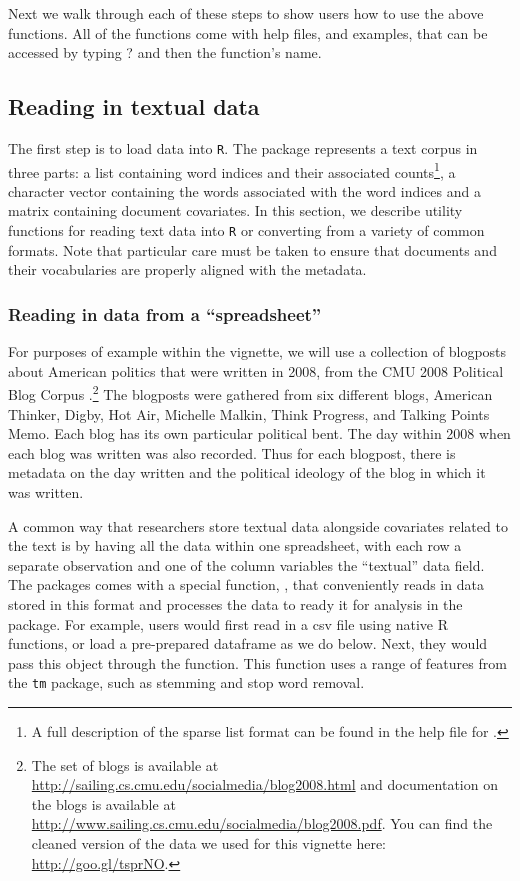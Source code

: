 \documentclass[nojss]{jss}
\begin{document}
Next we walk through each of these steps to show users how to use the above functions. All of the functions come with help files, and examples, that can be accessed by typing ? and then the function's name.

\subsection{Reading in textual data}

The first step is to load data into \texttt{R}. The  package represents a text corpus in three parts: a  list containing word indices and their associated counts\footnote{A full description of the sparse list format can be found in the help file for .}, a  character vector containing the words associated with the word indices and a  matrix containing document covariates. In this section, we describe utility functions for reading text data into \texttt{R} or converting from a variety of common formats. Note that particular care must be taken to ensure that documents and their vocabularies are properly aligned with the metadata.


\subsubsection{Reading in data from a ``spreadsheet''}

For purposes of example within the vignette, we will use a collection of blogposts about American politics that were written in 2008, from the CMU 2008 Political Blog Corpus \citep{poliblog}.\footnote{The set of blogs is available at \url{http://sailing.cs.cmu.edu/socialmedia/blog2008.html} and documentation on the blogs is available at \url{http://www.sailing.cs.cmu.edu/socialmedia/blog2008.pdf}.  You can find the cleaned version of the data we used for this vignette here: \url{http://goo.gl/tsprNO}.} The blogposts were gathered from six different blogs, American Thinker, Digby, Hot Air, Michelle Malkin, Think Progress, and Talking Points Memo.  Each blog has its own particular political bent.  The day within 2008 when each blog was written was also recorded.  Thus for each blogpost, there is metadata on the day written and the political ideology of the blog in which it was written.

A common way that researchers store textual data alongside covariates related to the text is by having all the data within one spreadsheet, with each row a separate observation and one of the column variables the ``textual'' data field. The  packages comes with a special function, , that conveniently reads in data stored in this format and processes the data to ready it for analysis in the  package.  For example, users would first read in a csv file using native R functions, or load a pre-prepared dataframe as we do below. Next, they would pass this object through the  function. This function uses a range of features from the \texttt{tm} package, such as stemming and stop word removal.
\end{document}

